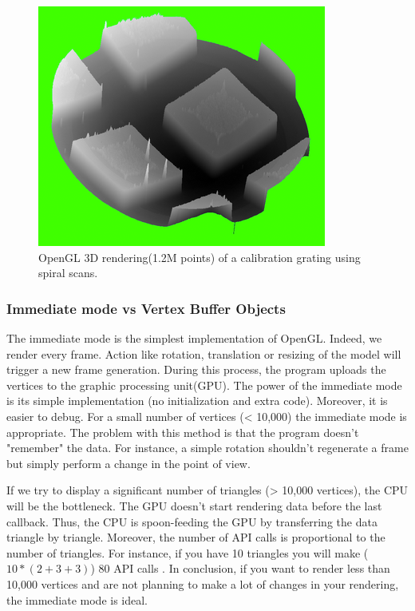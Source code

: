 \begin{figure}[!ht]
  \centering
  \includegraphics[scale=0.8]{images/3drendering.png}
    \caption{OpenGL 3D rendering(1.2M points) of a calibration grating using spiral scans.}
  \label{rendering3d}
\end{figure}

\subsubsection{Immediate mode vs Vertex Buffer Objects}

The immediate mode is the simplest implementation of OpenGL. Indeed, we render every frame. Action like rotation, translation or resizing of the model will trigger a new frame generation. During this process, the program uploads the vertices to the graphic processing unit(GPU). The power of the immediate mode is its simple implementation (no initialization and extra code). Moreover, it is easier to debug. For a small number of vertices (< 10,000) the immediate mode is appropriate. \cite{opengl1} The problem with this method is that the program doesn't "remember" the data. For instance, a simple rotation shouldn't regenerate a frame but simply perform a change in the point of view.

If we try to display a significant number of triangles (> 10,000 vertices), the CPU will be the bottleneck. The GPU doesn't start rendering data before the last callback. Thus, the CPU is spoon-feeding the GPU by transferring the data triangle by triangle. Moreover, the number of API calls is proportional to the number of triangles. For instance, if you have 10 triangles you will make ($10*(2+3+3)$) 80 API calls \cite{opengllegacy}. In conclusion, if you want to render less than 10,000 vertices and are not planning to make a lot of changes in your rendering, the immediate mode is ideal.

